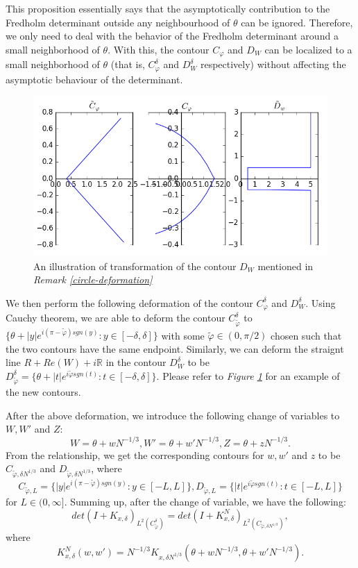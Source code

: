 This proposition essentially says that the asymptotically contribution to the Fredholm determinant outside any neighbourhood of $\theta$ can be ignored. Therefore, we only need to deal with the behavior of the Fredholm determinant around a small neighborhood of $\theta$. With this, the contour $C_{\varphi}$ and $D_{W}$ can be localized to a small neighborhood of $\theta$ (that is, $C_{\varphi}^{\delta}$ and $D_{W}^{\delta}$ respectively) without affecting the asymptotic behaviour of the determinant.

\begin{figure}
	\centering
	\includegraphics[width=\textwidth]{contour-cphi}
	\caption[Contour replacement of $D_W$]
	{An illustration of transformation of the contour $D_W$ mentioned in \textit{Remark \ref{circle-deformation}}}
	\label{fig:contour-second-replacement}
\end{figure}

We then perform the following deformation of the contour $C_{\varphi}^{\delta}$ and $D_W^{\delta}$. Using Cauchy theorem, we are able to deform the contour $C_{\tilde{\varphi}}^{\delta}$ to $\{\theta + |y|e^{i(\pi - \tilde{\varphi}) sgn(y)}: y \in [-\delta, \delta]\}$ with some $\tilde{\varphi} \in (0, \pi / 2)$ chosen such that the two contours have the same endpoint. Similarly, we can deform the straignt line $R+Re(W) + i \mathbb{R}$ in the contour $D_W^{\delta}$ to be $D_{\tilde{\varphi}}^{\delta} = \{\theta + |t| e^{i \tilde{\varphi} sgn(t)}: t \in [-\delta, \delta] \}$. Please refer to \textit{Figure \ref{fig:contour-second-replacement}} for an example of the new contours.

After the above deformation, we introduce the following change of variables to $W, W'$ and $Z$: $$W = \theta + wN^{-1/3}, W' = \theta + w' N^{-1/3}, Z = \theta + zN^{-1/3}.$$ From the relationship, we get the corresponding contours for $w, w'$ and $z$ to be $C_{\tilde{\varphi},\delta N^{1/3}}$ and $D_{\tilde{\varphi}, \delta N^{1/3}}$, where
$$C_{\tilde{\varphi},L} = \{|y|e^{i(\pi - \tilde{\varphi}) sgn(y)}: y \in [-L, L]\}, D_{\tilde{\varphi}, L} = \{|t| e^{i \tilde{\varphi} sgn(t)}: t \in [-L, L]\}$$ for $L \in (0, \infty].$ Summing up, after the change of variable, we have the following: $$det(I+K_{x, \delta})_{L^2(C_{\tilde{\varphi}}^{\delta})} = det(I +K_{x, \delta}^N )_{L^2(C_{\tilde{\varphi}, \delta N^{1/3}})},$$ where 
\begin{equation}
\label{rescaled-kernel}
K_{x, \delta}^N(w,w') = N^{-1/3} K_{x, \delta N^{1/3}} (\theta + wN^{-1/3}, \theta + w'N^{-1/3}).
\end{equation}

